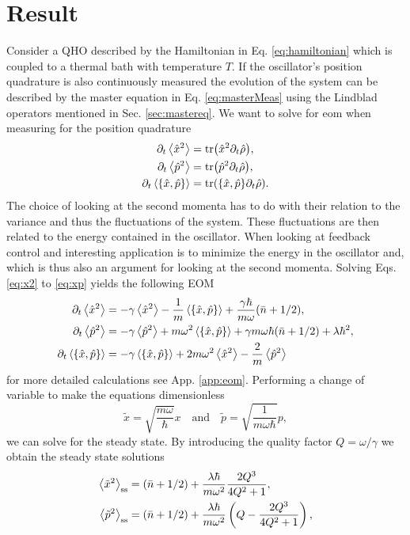 \section{Result}
Consider a QHO described by the Hamiltonian in Eq. \eqref{eq:hamiltonian} which is coupled to a thermal bath with temperature $T$. If the oscillator's position quadrature is also continuously measured the evolution of the system can be described by the master equation in Eq. \eqref{eq:masterMeas} using the Lindblad operators mentioned in Sec. \ref{sec:mastereq}. We want to solve for \gls{eom} when measuring for the position quadrature
\begin{align}
    \dt\expval{\xop^2} &= \tr(\xop^2 \dt \dmatrix)\label{eq:x2}, \\
    \dt\expval{\pop^2} &= \tr(\pop^2 \dt \dmatrix)\label{eq:p2},\\
    \dt\expval{\acomm{\xop}{\pop}} &= \tr(\acomm{\xop}{\pop} \dt \dmatrix). \label{eq:xp}
\end{align}
The choice of looking at the second momenta has to do with their relation to the variance and thus the fluctuations of the system. These fluctuations are then related to the energy contained in the oscillator. When looking at feedback control and interesting application is to minimize the energy in the oscillator and, which is thus also an argument for looking at the second momenta.
Solving Eqs. \eqref{eq:x2} to \eqref{eq:xp} yields the following EOM
\begin{align}
    \dt\expval{\xop^2} &= - \gamma \expval{\xop^2} - \frac{1}{m}\expval{\acomm{\xop}{\pop}} + \frac{\gamma \hbar}{m\omega}(\nbar + 1/2),\\
    \dt\expval{\pop^2} &= -\gamma \expval{\pop^2} + m\omega^2 \expval{\acomm{\xop}{\pop}} + \gamma m \omega\hbar (\nbar + 1/2) + \lambda \hbar^2,\\
    \dt\expval{\acomm{\xop}{\pop}} &= -\gamma \expval{\acomm{\xop}{\pop}} + 2 m \omega^2 \expval{\xop^2} - \frac{2}{m} \expval{\pop^2}
\end{align}
for more detailed calculations see App. \ref{app:eom}. Performing a change of variable to make the equations dimensionless
\begin{equation}
    \tilde{x} = \sqrt{\frac{m\omega}{\hbar}} x \quad \text{and} \quad \tilde{p} = \sqrt{\frac{1}{m \omega \hbar}} p ,
\end{equation}
we can solve for the steady state. By introducing the quality factor $Q = \omega / \gamma$ we obtain the steady state solutions
\begin{align}
    \expval{\tilde{x}^2}_\mathrm{ss} &= (\bar{n} + 1/2) + \frac{\lambda \hbar}{m \omega^2} \frac{2 Q^3}{4Q^2 + 1}, \label{eq:x2ss}\\
    \expval{\tilde{p}^2}_\mathrm{ss} &= (\bar{n} + 1/2) + \frac{\lambda \hbar}{m \omega^2} \left( Q - \frac{2Q^3}{4Q^2 + 1} \right) \label{eq:p2ss},\\
\end{align}
